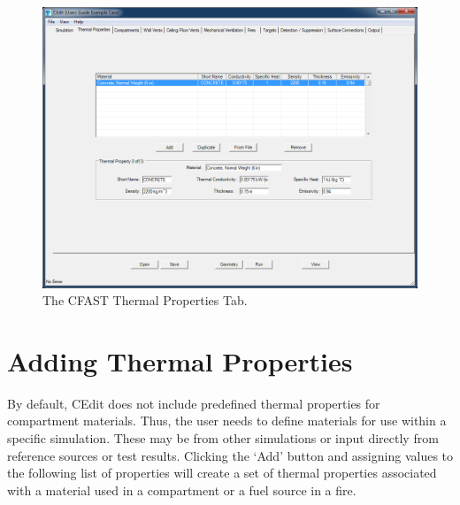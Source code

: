 \begin{figure}[ht]
\centering
\includegraphics[width=6.5in]{FIGURES/Thermal_Properties_Tab}
\caption[The CFAST Thermal Properties Tab]{The CFAST Thermal Properties Tab.}
\end{figure}

\section{Adding Thermal Properties}

By default, CEdit does not include predefined thermal properties for compartment materials. Thus, the user needs to define materials for use within a specific simulation. These may be from other simulations or input directly from reference sources or test results. Clicking the `Add' button and assigning values to the following list of properties will create a set of thermal properties associated with a material used in a compartment or a fuel source in a fire.

